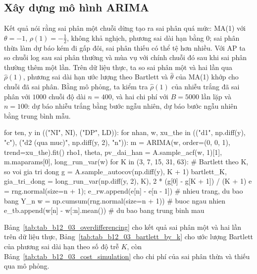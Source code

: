 \subsection{Xây dựng mô hình ARIMA}

 Kết quả  nói rằng sai phân một chuỗi dừng tạo ra sai phân quá mức: MA(1) với $\theta=-1$, $\rho(1)=-\tfrac12$, không khả nghịch, phương sai dài hạn bằng $0$; sai phân thừa làm dự báo kém đi gấp đôi, sai phân thiếu có thể tệ hơn nhiều.
 Với AP ta so chuỗi log sau sai phân thường và mùa vụ với chính chuỗi đó sau khi sai phân thường thêm một lần. Trên dữ liệu thực, ta so sai phân một và hai lần qua $\hat\rho(1)$, phương sai dài hạn ước lượng theo Bartlett và $\hat\theta$ của MA(1) khớp cho chuỗi đã sai phân. Bằng mô phỏng, ta kiểm tra $\hat\rho(1)$ của nhiễu trắng đã sai phân với $1000$ chuỗi độ dài $n=400$, và hai chi phí với $B=5000$ lần lặp và $n=100$: dự báo nhiễu trắng bằng bước ngẫu nhiên, dự báo bước ngẫu nhiên bằng trung bình mẫu.
\begin{codeblock}
for ten, y in (("NI", NI), ("DP", LD)):
    for nhan, w, xu_the in (("d1", np.diff(y), "c"), ("d2 (qua muc)", np.diff(y, 2), "n")):
        m = ARIMA(w, order=(0, 0, 1), trend=xu_the).fit()
        rho1, theta, pv_dai_han = A.sample_acf(w, 1)[1], m.maparams[0], long_run_var(w)
    for K in (3, 7, 15, 31, 63):                                # Bartlett theo K, so voi gia tri dong
        g = A.sample_autocov(np.diff(y), K + 1)
        bartlett_K, gia_tri_dong = long_run_var(np.diff(y, 2), K), 2 * (g[0] - g[K + 1]) / (K + 1)
e = rng.normal(size=n + 1); e_rw.append(e[n] - e[n - 1])      # nhieu trang, du bao bang Y_n
w = np.cumsum(rng.normal(size=n + 1))                         # buoc ngau nhien
e_tb.append(w[n] - w[:n].mean())                              # du bao bang trung binh mau
\end{codeblock}
 Bảng~\ref{tab:tab_b12_03_overdifferencing} cho kết quả sai phân một và hai lần trên dữ liệu thực, Bảng~\ref{tab:tab_b12_03_bartlett_by_k} cho ước lượng Bartlett của phương sai dài hạn theo số độ trễ $K$, còn Bảng~\ref{tab:tab_b12_03_cost_simulation} cho chi phí của sai phân thừa và thiếu qua mô phỏng.



